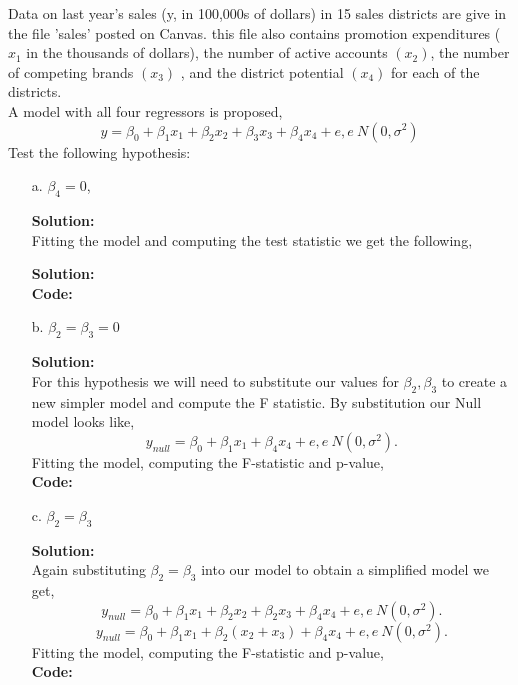 \documentclass[12pt]{article}
\makeatletter
\theoremstyle{homework}
\newenvironment{exercise}[1]
{\def\@currentlabel{#1}\exercisecore}
{\endexercisecore}
\newcommand{\localhead}[1]{\par\smallskip\noindent\textbf{#1}\nobreak\\}%
\newcommand\solution{\localhead{Solution:}}
\makeatother
\begin{document}
\newpage
 
\begin{exercise}{2} Data on last year's sales (y, in 100,000s of dollars) in 15 sales districts are give in the file 'sales'
  posted on Canvas. this file also contains promotion expenditures ($x_1$ in the thousands of dollars), the number 
  of active accounts $(x_2)$, the number of competing brands $(x_3)$ , and the district potential $(x_4)$ for each 
  of the districts.\\
  A model with all four regressors is proposed, 
  \begin{equation*}
    y = \beta_0 + \beta_1x_1 + \beta_2x_2 + \beta_3x_3 + \beta_4x_4 + e, e ~ N(0, \sigma^2)
  \end{equation*}
  Test the following hypothesis: 
  \begin{enumerate}
    \item[a.] $\beta_4 = 0$,
    \solution 
    Fitting the model and computing the test statistic we get the following, 
    \solution
    \textbf{Code:}
    \begin{center}
    
    \end{center} 
    \newpage


    \item[b.]$\beta_2 = \beta_3 = 0$\\
    \solution For this hypothesis we will need to substitute our values for $\beta_2, \beta_3$ to create a new
    simpler model and compute the F statistic. By substitution our Null model looks like, 
    \begin{equation*}
      y_{null} = \beta_0 + \beta_1x_1 + \beta_4x_4 + e, e ~ N(0, \sigma^2).
    \end{equation*}
    Fitting the model, computing the F-statistic and p-value,\\ 
    \textbf{Code:}
    \begin{center}
    
    \end{center} 
    \newpage


   \item[c.]$\beta_2 = \beta_3$\\
   \solution Again substituting $\beta_2 = \beta_3$ into our model to obtain a simplified model we get, 
   \begin{equation*}
    y_{null} = \beta_0 + \beta_1x_1 + \beta_2x_2 + \beta_2x_3+ \beta_4x_4 + e, e ~ N(0, \sigma^2).
  \end{equation*}
  \begin{equation*}
    y_{null} = \beta_0 + \beta_1x_1 + \beta_2(x_2 +x_3) + \beta_4x_4 + e, e ~ N(0, \sigma^2).
  \end{equation*}
  Fitting the model, computing the F-statistic and p-value, \\
   \textbf{Code:}
   \begin{center}
   
   \end{center} 
   \newpage


\end{enumerate}
\end{exercise}
\end{document}
